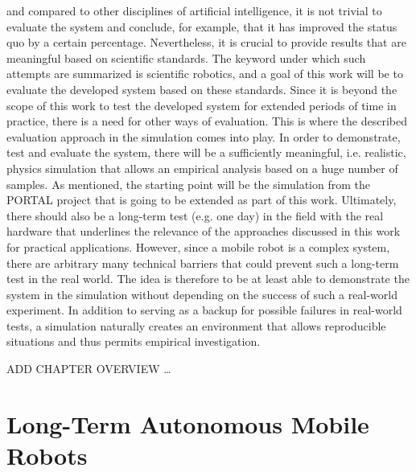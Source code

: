 \documentclass[english, master, utf8]{base/thesis_KBS}
\begin{document}
and compared to other disciplines of artificial intelligence, it is not trivial to evaluate the system and conclude, for example, that it has improved the status quo by a 
certain percentage. Nevertheless, it is crucial to provide results that are meaningful based on scientific standards. 
The keyword under which such attempts are summarized is scientific robotics, and a goal of this work will be to evaluate the developed system based on these standards.
Since it is beyond the scope of this work to test the developed system for extended periods of time in practice, there is a need for other ways of evaluation.
This is where the described evaluation approach in the simulation comes into play. In order to demonstrate, test and evaluate the system, there will be a sufficiently meaningful, 
i.e. realistic, physics simulation that allows an empirical analysis based on a huge number of samples. As mentioned, the starting point will be the simulation from the 
PORTAL project that is going to be extended as part of this work. Ultimately, there should also be a long-term test (e.g. one day) in the field with the real hardware that 
underlines the relevance of the approaches discussed in this work for practical applications. However, since a mobile robot is a complex system, there are arbitrary 
many technical barriers that could prevent such a long-term test in the real world. The idea is therefore to be at least able to demonstrate the system in the simulation
without depending on the success of such a real-world experiment. In addition to serving as a backup for possible failures in real-world tests,
a simulation naturally creates an environment that allows reproducible situations and thus permits empirical investigation.

ADD CHAPTER OVERVIEW \dots\newline

\chapter{Long-Term Autonomous Mobile Robots}
\end{document}
